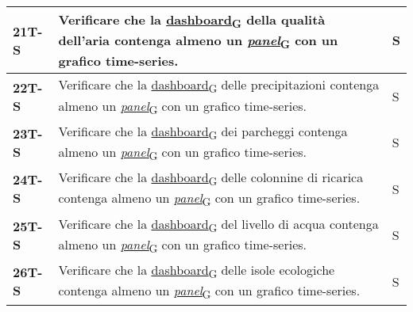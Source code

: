 \begin{longtable}{|>{\raggedright\arraybackslash}m{}|>{\raggedright\arraybackslash}m{}|>{\raggedright\arraybackslash}m{}|}
	\hline
	\textbf{21T-S}  & Verificare che la \href{https://7last.github.io/docs/pb/documentazione-interna/glossario\#dashboard}{dashboard\textsubscript{G}} della qualità dell'aria contenga almeno un \href{https://7last.github.io/docs/pb/documentazione-interna/glossario\#panel}{\textit{panel}\textsubscript{G}} con un grafico time-series.                                                                                  & S              \\
	\hline
	\textbf{22T-S}  & Verificare che la \href{https://7last.github.io/docs/pb/documentazione-interna/glossario\#dashboard}{dashboard\textsubscript{G}} delle precipitazioni contenga almeno un \href{https://7last.github.io/docs/pb/documentazione-interna/glossario\#panel}{\textit{panel}\textsubscript{G}} con un grafico time-series.                                                                                     & S              \\
	\hline
	\textbf{23T-S}  & Verificare che la \href{https://7last.github.io/docs/pb/documentazione-interna/glossario\#dashboard}{dashboard\textsubscript{G}} dei parcheggi contenga almeno un \href{https://7last.github.io/docs/pb/documentazione-interna/glossario\#panel}{\textit{panel}\textsubscript{G}} con un grafico time-series.                                                                                            & S              \\
	\hline
	\textbf{24T-S}  & Verificare che la \href{https://7last.github.io/docs/pb/documentazione-interna/glossario\#dashboard}{dashboard\textsubscript{G}} delle colonnine di ricarica contenga almeno un \href{https://7last.github.io/docs/pb/documentazione-interna/glossario\#panel}{\textit{panel}\textsubscript{G}} con un grafico time-series.                                                                              & S              \\
	\hline
	\textbf{25T-S}  & Verificare che la \href{https://7last.github.io/docs/pb/documentazione-interna/glossario\#dashboard}{dashboard\textsubscript{G}} del livello di acqua contenga almeno un \href{https://7last.github.io/docs/pb/documentazione-interna/glossario\#panel}{\textit{panel}\textsubscript{G}} con un grafico time-series.                                                                                     & S              \\
	\hline
	\textbf{26T-S}  & Verificare che la \href{https://7last.github.io/docs/pb/documentazione-interna/glossario\#dashboard}{dashboard\textsubscript{G}} delle isole ecologiche contenga almeno un \href{https://7last.github.io/docs/pb/documentazione-interna/glossario\#panel}{\textit{panel}\textsubscript{G}} con un grafico time-series.                                                                                   & S              \\

\end{longtable}
